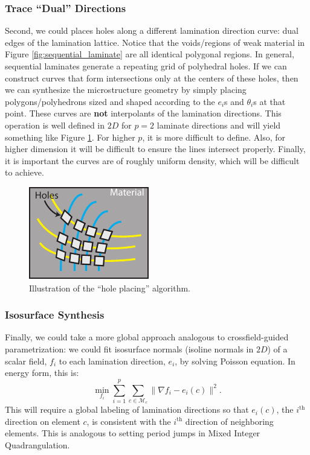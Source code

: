 \documentclass[10pt]{article}
\providecommand{\norm}[1]{\lVert#1\rVert}
\providecommand{\mesh}{\mathcal{M}}
\begin{document}
\subsubsection{Trace ``Dual'' Directions}
\label{sec:dual_trace}
Second, we could places holes along a different lamination direction curve: dual
edges of the lamination lattice. Notice that the voids/regions of weak material
in Figure \ref{fig:sequential_laminate} are all identical polygonal regions. In
general, sequential laminates generate a repeating grid of polyhedral holes. If
we can construct curves that form intersections only at the centers of
these holes, then we can synthesize the microstructure geometry by simply placing
polygons/polyhedrons sized and shaped according to the $e_i$s and $\theta_i$s at
that point. These curves are \textbf{not} interpolants of the lamination
directions. This operation is well defined in $2D$ for $p = 2$ laminate
directions and will yield something like Figure \ref{fig:hole_place}. For higher
$p$, it is more difficult to define. Also, for higher dimension it will be
difficult to ensure the lines intersect properly. Finally, it is important the
curves are of roughly uniform density, which will be difficult to achieve.
\begin{figure}[h!]
    \centering
\includegraphics[height=0.3\textwidth]{images/hole_packing}
\caption{Illustration of the ``hole placing'' algorithm.}
\label{fig:hole_place}
\end{figure}

\subsubsection{Isosurface Synthesis}
\label{sec:isosurface}
Finally, we could take a more global approach analogous to crossfield-guided
parametrization: we could fit isosurface normals (isoline normals in
$2D$) of a scalar field, $f_i$ to each lamination direction, $e_i$, by solving
Poisson equation. In energy form, this is:
$$
\min_{f_i} \sum_{i=1}^p \sum_{c \in \mesh_c} \norm{\nabla f_i - e_i(c)}^2.
$$
This will require a global labeling of lamination directions so that $e_i(c)$, the
$i^\text{th}$ direction on element $c$, is consistent with the $i^\text{th}$
direction of neighboring elements. This is analogous to setting period jumps in
Mixed Integer Quadrangulation.
\end{document}
